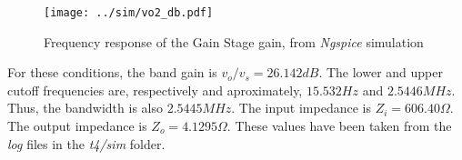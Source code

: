 \vspace{-2cm}
\begin{figure}[H]
\centering
  \texttt{[image: ../sim/vo2\_db.pdf]}
  \caption{Frequency response of the Gain Stage gain, from \textit{Ngspice} simulation}
  \label{fig:gain_stage_gain(freq)}
\end{figure}

\par For these conditions, the band gain is $v_o/v_s = 26.142 dB$. The lower and upper cutoff frequencies are, respectively and aproximately, $15.532 Hz$ and $2.5446 MHz$. Thus, the bandwidth is also $2.5445 MHz$. The input impedance is $Z_i=606.40\Omega$. The output impedance is $Z_o=4.1295 \Omega$. These values have been taken from the \textit{log} files in the \textit{t4/sim} folder.









